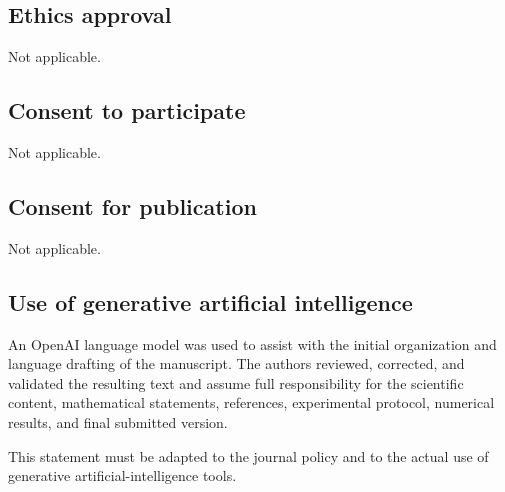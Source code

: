 \documentclass[pdflatex,sn-mathphys-num,iicol,oneside]{sn-jnl}
\begin{document}
\subsection*{Ethics approval}

Not applicable.

\subsection*{Consent to participate}

Not applicable.

\subsection*{Consent for publication}

Not applicable.

\subsection*{Use of generative artificial intelligence}

An OpenAI language model was used to assist with the initial
organization and language drafting of the manuscript. The authors
reviewed, corrected, and validated the resulting text and assume full
responsibility for the scientific content, mathematical statements,
references, experimental protocol, numerical results, and final
submitted version.

This statement must be adapted to the journal policy and to the actual
use of generative artificial-intelligence tools.



\end{document}
